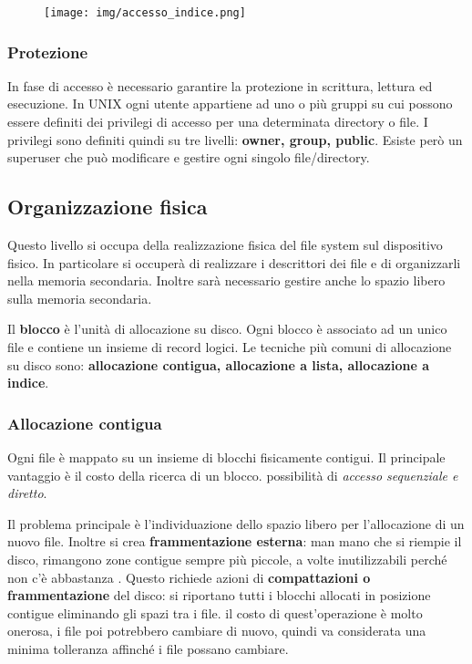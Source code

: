 \documentclass{article}
\begin{document}
 \begin{figure}[h!]
    \begin{center}
        \texttt{[image: img/accesso\_indice.png]}      
    \end{center}
\end{figure}

\subsubsection{Protezione}
In fase di accesso è necessario garantire la protezione in scrittura, 
lettura ed esecuzione. In UNIX ogni utente appartiene ad uno o più
gruppi su cui possono essere definiti dei privilegi di accesso per una
determinata directory o file. I privilegi sono definiti quindi su tre livelli:
\textbf{owner, group, public}. Esiste però un superuser che può modificare
e gestire ogni singolo file/directory.

\subsection{Organizzazione fisica}
Questo livello si occupa della realizzazione fisica del file system 
sul dispositivo fisico. In particolare si occuperà di realizzare
i descrittori dei file e di organizzarli nella memoria secondaria. 
Inoltre sarà necessario gestire anche lo spazio libero sulla memoria secondaria.

\noindent Il \textbf{blocco} è l'unità di allocazione su disco. Ogni blocco
è associato ad un unico file e contiene un insieme di record logici.
Le tecniche più comuni di allocazione su disco sono: \textbf{allocazione
contigua, allocazione a lista, allocazione a indice}.

\subsubsection{Allocazione contigua}
Ogni file è mappato su un insieme di blocchi fisicamente contigui.
Il principale vantaggio è il costo della ricerca di un blocco. possibilità
di \textit{accesso sequenziale e diretto}.
\medskip

\noindent Il problema principale è l'individuazione dello spazio
libero per l'allocazione di un nuovo file. Inoltre si
crea \textbf{frammentazione esterna}:  man mano che si riempie il disco,
 rimangono zone contigue sempre più piccole, a volte
inutilizzabili perché non c'è abbastanza . Questo richiede azioni di
 \textbf{compattazioni o frammentazione} del disco: si riportano 
 tutti i blocchi allocati in posizione contigue eliminando gli 
 spazi tra i file. il costo di quest'operazione è molto onerosa, i
 file poi potrebbero cambiare di nuovo, quindi va considerata una 
 minima tolleranza affinché i file possano cambiare.
 
\end{document}
